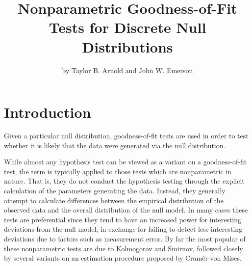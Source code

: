 \title{Nonparametric Goodness-of-Fit Tests for Discrete Null Distributions}
\author{by Taylor B. Arnold and John W. Emerson}

\maketitle




\section{Introduction}

Given a particular null distribution, goodness-of-fit tests 
are used in order to test whether it is likely that the data were generated via the null distribution.

While almost any hypothesis test can be viewed as a variant on a goodness-of-fit test, the term is typically
applied to those tests which are nonparametric in nature. That is, they do not conduct the hypothesis testing 
through the explicit calculation of the parameters generating the data. Instead, they generally attempt to 
calculate differences between the empirical distribution of the observed data and the overall distribution 
of the null model. In many cases these tests are preferential since they tend to have an increased power for 
interesting deviations from the null model, in exchange for failing to detect less interesting deviations due to 
factors such as measurement error. By far the most popular of these nonparametric tests are due to Kolmogorov and 
Smirnov, followed closely by several variants on an estimation procedure proposed by Cram\'{e}r-von Mises. 


